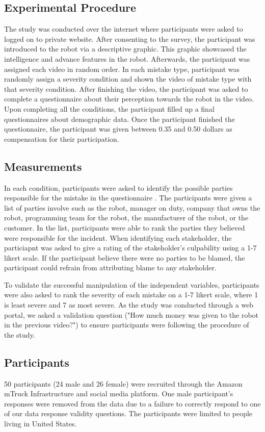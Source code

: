 \documentclass{sigchi}
\begin{document}
\subsection{Experimental Procedure}
The study was conducted over the internet where participants were asked to logged on to private website. After consenting to the survey, the participant was introduced to the robot via a descriptive graphic. This graphic showcased the intelligence and advance features in the robot. Afterwards, the participant was assigned each video in random order. In each mistake type, participant was randomly assign a severity condition and shown the video of mistake type with that severity condition. After finishing the video, the participant was asked to complete a questionnaire about their perception towards the robot in the video. Upon completing all the conditions, the participant filled up a final questionnaires about demographic data. Once the participant finished the questionnaire, the participant was given between 0.35 and 0.50 dollars as compensation for their participation.

\subsection{Measurements}
In each condition, participants were asked to identify the possible parties responsible for the mistake in the questionnaire . The participants were given a list of parties involve such as the robot, manager on duty, company that owns the robot, programming team for the robot, the manufacturer of the robot, or the customer. In the list, participants were able to rank the parties they believed were responsible for the incident. When identifying each stakeholder, the particiapnt was asked to give a rating of the stakeholder's culpability using a 1-7 likert scale. If the participant believe there were no parties to be blamed, the participant could refrain from attributing blame to any stakeholder. 

To validate the successful manipulation of the independent variables, participants were also asked to rank the severity of each mistake on a 1-7 likert scale, where 1 is least severe and 7 as most severe. As the study was conducted through a web portal, we asked a validation question ("How much money was given to the robot in the previous video?") to ensure participants were following the procedure of the study.

\subsection{Participants}
50 participants (24 male and 26 female) were recruited through the Amazon mTruck Infrastructure and social media platform. One male participant's responses were removed from the data due to a failure to correctly respond to one of our data response validity questions. The participants were limited to people living in  United States.
\end{document}
